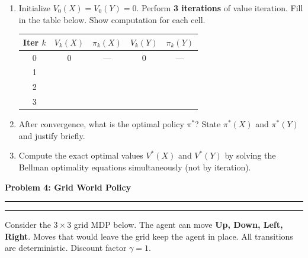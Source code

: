 \documentclass[12pt]{article}
\newcommand{\question}[1]{%
  \clearpage
  \vspace{0.5cm}
  {\noindent\normalsize \textbf{#1}}
  \vspace{0.2cm}
  \hrule
  \vspace{0.1cm}
  \hrule
  \vspace{0.3cm}
}
\begin{document}
\begin{enumerate}[label=(\alph*)]
\item Initialize $V_0(X) = V_0(Y) = 0$. Perform \textbf{3 iterations} of value iteration. Fill in the table below. Show computation for each cell.

\begin{center}
\begin{tabular}{ccccc}
\toprule
\textbf{Iter $k$} & $V_k(X)$ & $\pi_k(X)$ & $V_k(Y)$ & $\pi_k(Y)$ \\
\midrule
0 & 0 & --- & 0 & --- \\[0.5em]
1 & & & & \\[0.5em]
2 & & & & \\[0.5em]
3 & & & & \\
\bottomrule
\end{tabular}
\end{center}

\vspace{6cm}

\item After convergence, what is the optimal policy $\pi^*$? State $\pi^*(X)$ and $\pi^*(Y)$ and justify briefly.

\vspace{3cm}

\item Compute the exact optimal values $V^*(X)$ and $V^*(Y)$ by solving the Bellman optimality equations simultaneously (not by iteration).

\vspace{5cm}
\end{enumerate}


\question{Problem 4: Grid World Policy}\label{prob:grid}

Consider the $3 \times 3$ grid MDP below. The agent can move \textbf{Up, Down, Left, Right}. Moves that would leave the grid keep the agent in place. All transitions are deterministic. Discount factor $\gamma = 1$.
\end{document}
